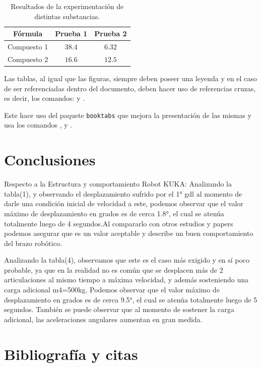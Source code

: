 \documentclass{aleph-revista}
\begin{document}
{\begin{table}[H]
    \centering\small
    \begin{tabular}{ccc}
    \toprule
        \textbf{Fórmula} & \textbf{Prueba 1} & \textbf{Prueba 2} \\ 
    \midrule
        Compuesto 1 & $38.4$  &  $6.32$\\ 
        Compuesto 2 & $16.6$ & $12.5$ \\ 
    \bottomrule
    \end{tabular}
    \label{tab:01}
    \caption{Resultados de la experimentación de distintas substancias.}
\end{table}

Las tablas, al igual que las figuras, siempre deben poseer una leyenda y en el caso de ser referenciadas dentro del documento, deben hacer uso de referencias cruzas, es decir, los comandos: \verb@{} y \verb@{}.


Este hace uso del paquete \texttt{booktabs} que mejora la presentación de las mismas y usa los comandos \verb@\toprule@, \verb@\midrule@ y \verb@\bottomrule@.

\section{Conclusiones}

Respecto a la Estructura y comportamiento Robot KUKA:
Analizando la tabla(1), y observando el desplazamiento sufrido por el 1° gdl al momento de darle una condición inicial de velocidad a este, podemos observar que el valor máximo de desplazamiento en grados es de cerca 1.8°, el cual se atenúa totalmente luego de 4 segundos.Al compararlo con otros estudios y papers podemos asegurar que es un valor aceptable y describe un buen comportamiento del brazo robótico.

Analizando la tabla(4), observamos que este es el caso más exigido y en sí poco probable, ya que en la realidad no es común que se desplacen más de 2 articulaciones al mismo tiempo a máxima velocidad, y además sosteniendo una carga adicional m4=500kg. Podemos observar que el valor máximo de desplazamiento en grados es de cerca 9.5°, el cual se atenúa totalmente luego de 5 segundos. También se puede observar que al momento de sostener la carga adicional, las aceleraciones angulares aumentan en gran medida.


\section{Bibliografía y citas}

}
\end{document}
